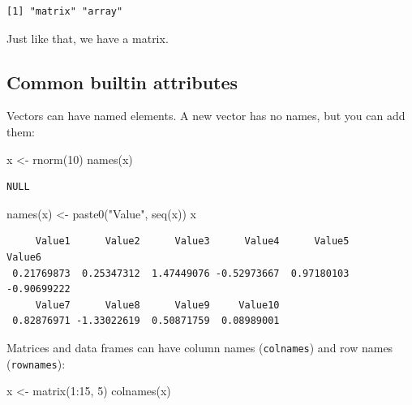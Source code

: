 \documentclass[
]{book}
\newenvironment{Shaded}{\begin{snugshade}}{\end{snugshade}}
\newcommand{\DecValTok}[1]{\textcolor[rgb]{0.00,0.00,0.81}{#1}}
\newcommand{\FunctionTok}[1]{\textcolor[rgb]{0.00,0.00,0.00}{#1}}
\newcommand{\NormalTok}[1]{#1}
\newcommand{\OtherTok}[1]{\textcolor[rgb]{0.56,0.35,0.01}{#1}}
\newcommand{\SpecialCharTok}[1]{\textcolor[rgb]{0.00,0.00,0.00}{#1}}
\newcommand{\StringTok}[1]{\textcolor[rgb]{0.31,0.60,0.02}{#1}}
\begin{document}
\begin{verbatim}
[1] "matrix" "array" 
\end{verbatim}

Just like that, we have a matrix.

\hypertarget{common-builtin-attributes}{%
\subsection{Common builtin attributes}\label{common-builtin-attributes}}

Vectors can have named elements. A new vector has no names, but you can add them:

\begin{Shaded}
\begin{Highlighting}[]
\NormalTok{x }\OtherTok{\textless{}{-}} \FunctionTok{rnorm}\NormalTok{(}\DecValTok{10}\NormalTok{)}
\FunctionTok{names}\NormalTok{(x)}
\end{Highlighting}
\end{Shaded}

\begin{verbatim}
NULL
\end{verbatim}

\begin{Shaded}
\begin{Highlighting}[]
\FunctionTok{names}\NormalTok{(x) }\OtherTok{\textless{}{-}} \FunctionTok{paste0}\NormalTok{(}\StringTok{"Value"}\NormalTok{, }\FunctionTok{seq}\NormalTok{(x))}
\NormalTok{x}
\end{Highlighting}
\end{Shaded}

\begin{verbatim}
     Value1      Value2      Value3      Value4      Value5      Value6 
 0.21769873  0.25347312  1.47449076 -0.52973667  0.97180103 -0.90699222 
     Value7      Value8      Value9     Value10 
 0.82876971 -1.33022619  0.50871759  0.08989001 
\end{verbatim}

Matrices and data frames can have column names (\texttt{colnames}) and row names (\texttt{rownames}):

\begin{Shaded}
\begin{Highlighting}[]
\NormalTok{x }\OtherTok{\textless{}{-}} \FunctionTok{matrix}\NormalTok{(}\DecValTok{1}\SpecialCharTok{:}\DecValTok{15}\NormalTok{, }\DecValTok{5}\NormalTok{)}
\FunctionTok{colnames}\NormalTok{(x)}
\end{Highlighting}
\end{Shaded}
\end{document}
